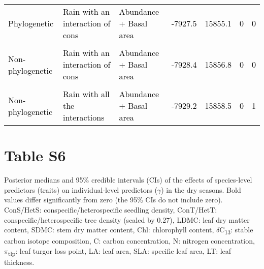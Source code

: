 \documentclass[
  12pt,
  letterpaper,
  DIV=11,
  numbers=noendperiod]{scrartcl}
\begin{document}
\begin{table}[H]
{\begin{tabular}[t]{lllllll}
\textcolor{black}{Phylogenetic} & \textcolor{black}{Rain with an interaction of cons} & \textcolor{black}{Abundance + Basal area} & \textcolor{black}{-7927.5} & \textcolor{black}{15855.1} & \textcolor{black}{0} & \textcolor{black}{0}\\
\cellcolor{gray!6}{\textcolor{black}{Phylogenetic}} & \cellcolor{gray!6}{\textcolor{black}{No rain}} & \cellcolor{gray!6}{\textcolor{black}{Abundance + Basal area}} & \cellcolor{gray!6}{\textcolor{black}{-7928.0}} & \cellcolor{gray!6}{\textcolor{black}{15856.1}} & \cellcolor{gray!6}{\textcolor{black}{0}} & \cellcolor{gray!6}{\textcolor{black}{0}}\\
\textcolor{black}{Non-phylogenetic} & \textcolor{black}{Rain with an interaction of cons} & \textcolor{black}{Abundance + Basal area} & \textcolor{black}{-7928.4} & \textcolor{black}{15856.8} & \textcolor{black}{0} & \textcolor{black}{0}\\
\cellcolor{gray!6}{\textcolor{black}{Non-phylogenetic}} & \cellcolor{gray!6}{\textcolor{black}{No rain}} & \cellcolor{gray!6}{\textcolor{black}{Abundance + Basal area}} & \cellcolor{gray!6}{\textcolor{black}{-7928.6}} & \cellcolor{gray!6}{\textcolor{black}{15857.2}} & \cellcolor{gray!6}{\textcolor{black}{0}} & \cellcolor{gray!6}{\textcolor{black}{0}}\\
\addlinespace
\textcolor{black}{Non-phylogenetic} & \textcolor{black}{Rain with all the interactions} & \textcolor{black}{Abundance + Basal area} & \textcolor{black}{-7929.2} & \textcolor{black}{15858.5} & \textcolor{black}{0} & \textcolor{black}{1}\\
\bottomrule
\end{tabular}}
\end{table}

\newpage

\hypertarget{table-s6}{%
\section{Table S6}\label{table-s6}}

Posterior medians and 95\% credible intervals (CIs) of the effects of
species-level predictors (traits) on individual-level predictors
(\(\gamma\)) in the dry seasons. Bold values differ significantly from
zero (the 95\% CIs do not include zero). ConS/HetS:
conspecific/heterospecific seedling density, ConT/HetT:
conspecific/heterospecific tree density (scaled by 0.27), LDMC: leaf dry
matter content, SDMC: stem dry matter content, Chl: chlorophyll content,
\(\delta\)C\textsubscript{13}: stable carbon isotope composition, C:
carbon concentration, N: nitrogen concentration,
\(\pi\)\textsubscript{tlp}: leaf turgor loss point, LA: leaf area, SLA:
specific leaf area, LT: leaf thickness.
\end{document}
